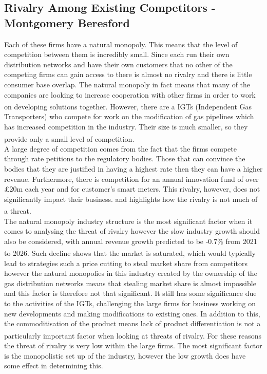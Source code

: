 \documentclass[11pt]{article}		%
\newcommand{\supercite}[1]{\textsuperscript{\cite{#1}}}		%
\begin{document}
        \subsection[Rivalry Among Existing Competitors]{Rivalry Among Existing Competitors - Montgomery Beresford}
                Each of these firms have a natural monopoly. This means that the level of competition between them is incredibly small. Since each run their own distribution networks and have their own customers that no other of the competing firms can gain access to there is almost no rivalry and there is little consumer base overlap. The natural monopoly in fact means that many of the companies are looking to increase cooperation with other firms in order to work on developing solutions together.\supercite{SGN-GD2} 
                However, there are a IGTs (Independent Gas Transporters) who compete for work on the modification of gas pipelines which has increased competition in the industry. Their size is much smaller, so they provide only a small level of competition.\supercite{Gas_Distribution_Industry} 
                \\
                A large degree of competition comes from the fact that the firms compete through rate petitions to the regulatory bodies. Those that can convince the bodies that they are justified in having a highest rate then they can have a higher revenue. Furthermore, there is competition for an annual innovation fund of over £20m each year and for customer’s smart meters. This rivalry, however, does not significantly impact their business. and highlights how the rivalry is not much of a threat.\supercite{Gas_Distribution_Industry}
                \\
                The natural monopoly industry structure is the most significant factor when it comes to analysing the threat of rivalry however the slow industry growth should also be considered, with annual revenue growth predicted to be -0.7\% from 2021 to 2026.\supercite{Gas_Distribution_Industry} Such decline shows that the market is saturated, which would typically lead to strategies such a price cutting to steal market share from competitors however the natural monopolies in this industry created by the ownership of the gas distribution networks means that stealing market share is almost impossible and this factor is therefore not that significant. It still has some significance due to the activities of the IGTs, challenging the large firms for business working on new developments and making modifications to existing ones. 
                In addition to this, the commoditisation of the product means lack of product differentiation is not a particularly important factor when looking at threats of rivalry.\supercite{Gas_Distribution_Industry}
                For these reasons the threat of rivalry is very low within the large firms. The most significant factor is the monopolistic set up of the industry, however the low growth does have some effect in determining this.
\end{document}
